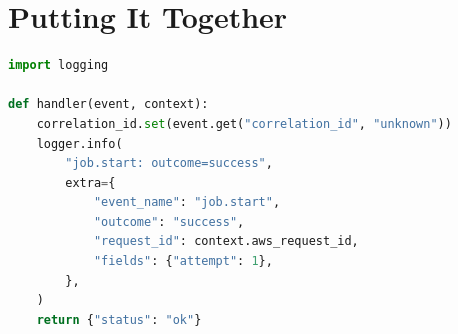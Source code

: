 \section{Putting It Together}
\begin{lstlisting}[language=Python]
import logging

def handler(event, context):
    correlation_id.set(event.get("correlation_id", "unknown"))
    logger.info(
        "job.start: outcome=success",
        extra={
            "event_name": "job.start",
            "outcome": "success",
            "request_id": context.aws_request_id,
            "fields": {"attempt": 1},
        },
    )
    return {"status": "ok"}
\end{lstlisting}
